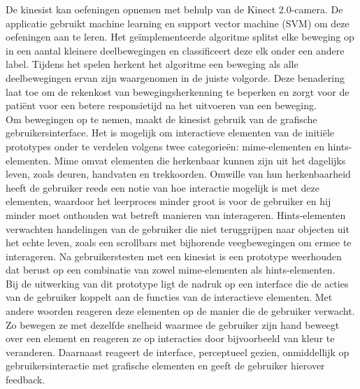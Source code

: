 De kinesist kan oefeningen opnemen met behulp van de Kinect 2.0-camera. De applicatie gebruikt machine learning en support vector machine (SVM) om deze oefeningen aan te leren. Het ge\"implementeerde algoritme splitst elke beweging op in een aantal kleinere deelbewegingen en classificeert deze elk onder een andere label. Tijdens het spelen herkent het algoritme een beweging als alle deelbewegingen ervan zijn waargenomen in de juiste volgorde. Deze benadering laat toe om de rekenkost van bewegingsherkenning te beperken en zorgt voor de pati\"ent voor een betere responsietijd na het uitvoeren van een beweging.\\

Om bewegingen op te nemen, maakt de kinesist gebruik van de grafische gebruikersinterface. Het is mogelijk om interactieve elementen van de initi\"ele prototypes onder te verdelen volgens twee categorie\"en: mime-elementen en hints-elementen. Mime omvat elementen die herkenbaar kunnen zijn uit het dagelijks leven, zoals deuren, handvaten en trekkoorden. Omwille van hun herkenbaarheid heeft de gebruiker reeds een notie van hoe interactie mogelijk is met deze elementen, waardoor het leerproces minder groot is voor de gebruiker en hij minder moet onthouden wat betreft manieren van interageren. Hints-elementen verwachten handelingen van de gebruiker die niet teruggrijpen naar objecten uit het echte leven, zoals een scrollbars met bijhorende veegbewegingen om ermee te interageren. Na gebruikerstesten met een kinesist is een prototype weerhouden dat berust op een combinatie van zowel mime-elementen als hints-elementen.\\

Bij de uitwerking van dit prototype ligt de nadruk op een interface die de acties van de gebruiker koppelt aan de functies van de interactieve elementen. Met andere woorden reageren deze elementen op de manier die de gebruiker verwacht. Zo bewegen ze met dezelfde snelheid waarmee de gebruiker zijn hand beweegt over een element en reageren ze op interacties door bijvoorbeeld van kleur te veranderen. Daarnaast reageert de interface, perceptueel gezien, onmiddellijk op gebruikersinteractie met grafische elementen en geeft de gebruiker hierover feedback.\\

